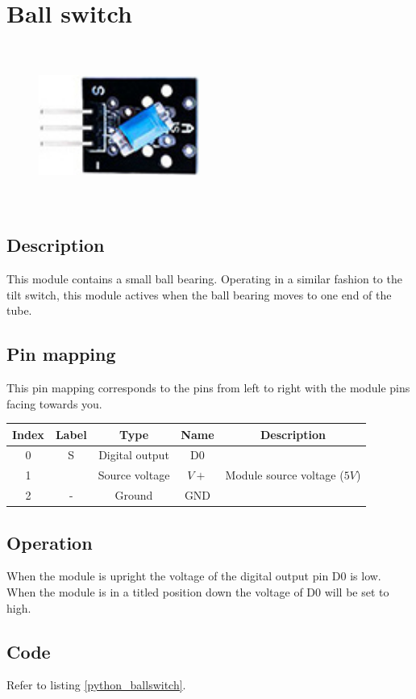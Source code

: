 \section{Ball switch}
\begin{figure}[H]
    \centering
    \includegraphics[angle=0, keepaspectratio=true, scale=1, width=200px, height=200px]{images/ball.jpg}
\end{figure}
\subsection*{Description}
This module contains a small ball bearing. Operating in a similar fashion to the tilt switch, this module actives when the ball bearing moves to one end of the tube.
\subsection*{Pin mapping}
This pin mapping corresponds to the pins from left to right with the module pins facing towards you.
\begin{table}[H]
    \centering
    \begin{tabular}{|c|c|c|c|c|}
    \hline
    Index &Label &Type &Name &Description\\ \hline
    0 &S &Digital output &D0 &\\ \hline
    1 & &Source voltage &$V+$ &Module source voltage ($5V$)\\ \hline
    2 &- &Ground &GND &\\ \hline
    \end{tabular}
\end{table}
\subsection*{Operation}
When the module is upright the voltage of the digital output pin D0 is low. When the module is in a titled position down the voltage of D0 will be set to high.
\subsection*{Code}
Refer to listing \ref{python_ballswitch}.
%
